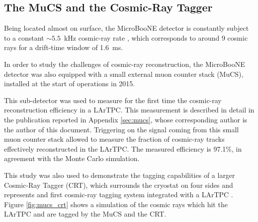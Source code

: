 \subsection{The MuCS and the Cosmic-Ray Tagger}\label{sec:crt}

Being located almost on surface, the MicroBooNE detector is constantly subject to a constant $\sim5.5$~kHz cosmic-ray rate \cite{Acciarri:2017rnj}, which corresponds to around 9 cosmic rays for a drift-time window of 1.6~ms. 

In order to study the challenges of cosmic-ray reconstruction, the MicroBooNE detector was also equipped with a small external muon counter stack (MuCS), installed at the start of operations in 2015. 

This sub-detector was used to measure for the first time the cosmic-ray reconstruction efficiency in a LArTPC. This measurement is described in detail in the publication reported in Appendix \ref{sec:mucs}, whose corresponding author is the author of this document. Triggering on the signal coming from this small muon counter stack allowed to measure the fraction of cosmic-ray tracks effectively reconstructed in the LArTPC. The measured efficiency is 97.1\%, in agreement with the Monte Carlo simulation. 

This study was also used to demonstrate the tagging capabilities of a larger Cosmic-Ray Tagger (CRT), which surrounds the cryostat on four sides and represents and first cosmic-ray tagging system integrated with a LArTPC \cite{Auger:2016tjc}. Figure \ref{fig:mucs_crt} shows a simulation of the cosmic rays which hit the LArTPC and are tagged by the MuCS and the CRT.

